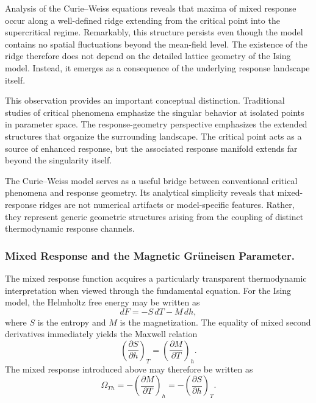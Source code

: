 Analysis of the Curie--Weiss equations reveals that maxima of mixed
response occur along a well-defined ridge extending from the critical
point into the supercritical regime. Remarkably, this structure
persists even though the model contains no spatial fluctuations beyond
the mean-field level. The existence of the ridge therefore does not
depend on the detailed lattice geometry of the Ising model. Instead,
it emerges as a consequence of the underlying response landscape
itself.

This observation provides an important conceptual distinction.
Traditional studies of critical phenomena emphasize the singular
behavior at isolated points in parameter space. The response-geometry
perspective emphasizes the extended structures that organize the
surrounding landscape. The critical point acts as a source of enhanced
response, but the associated response manifold extends far beyond the
singularity itself.

The Curie--Weiss model  serves as a useful bridge between
conventional critical phenomena and response geometry. Its analytical
simplicity reveals that mixed-response ridges are not numerical
artifacts or model-specific features. Rather, they represent generic
geometric structures arising from the coupling of distinct
thermodynamic response channels.

\subsubsection{Mixed Response and the Magnetic Gr\"uneisen Parameter.}

The mixed response function acquires a particularly transparent
thermodynamic interpretation when viewed through the fundamental
equation. For the Ising model, the Helmholtz free energy may be written
as
\begin{equation}
dF = -S\,dT - M\,dh,
\end{equation}
where \(S\) is the entropy and \(M\) is the magnetization. The equality
of mixed second derivatives immediately yields the Maxwell relation
\begin{equation}
\left(\frac{\partial S}{\partial h}\right)_T
=
\left(\frac{\partial M}{\partial T}\right)_h.
\end{equation}
The mixed response introduced above may therefore be written as
\begin{equation}
\Omega_{Th}
=
-\left(\frac{\partial M}{\partial T}\right)_h
=
-\left(\frac{\partial S}{\partial h}\right)_T.
\label{eq:Omega_Maxwell}
\end{equation}

